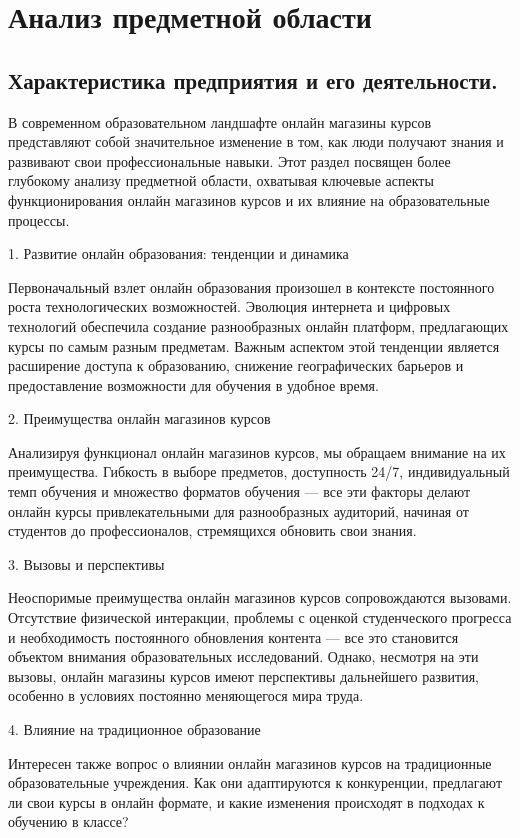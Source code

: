 \section{Анализ предметной области}
\subsection{Характеристика предприятия и его деятельности.}

В современном образовательном ландшафте онлайн магазины курсов представляют собой значительное изменение в том, как люди получают знания и развивают свои профессиональные навыки. Этот раздел посвящен более глубокому анализу предметной области, охватывая ключевые аспекты функционирования онлайн магазинов курсов и их влияние на образовательные процессы.

1. Развитие онлайн образования: тенденции и динамика

Первоначальный взлет онлайн образования произошел в контексте постоянного роста технологических возможностей. Эволюция интернета и цифровых технологий обеспечила создание разнообразных онлайн платформ, предлагающих курсы по самым разным предметам. Важным аспектом этой тенденции является расширение доступа к образованию, снижение географических барьеров и предоставление возможности для обучения в удобное время.

2. Преимущества онлайн магазинов курсов

Анализируя функционал онлайн магазинов курсов, мы обращаем внимание на их преимущества. Гибкость в выборе предметов, доступность 24/7, индивидуальный темп обучения и множество форматов обучения — все эти факторы делают онлайн курсы привлекательными для разнообразных аудиторий, начиная от студентов до профессионалов, стремящихся обновить свои знания.

3. Вызовы и перспективы

Неоспоримые преимущества онлайн магазинов курсов сопровождаются вызовами. Отсутствие физической интеракции, проблемы с оценкой студенческого прогресса и необходимость постоянного обновления контента — все это становится объектом внимания образовательных исследований. Однако, несмотря на эти вызовы, онлайн магазины курсов имеют перспективы дальнейшего развития, особенно в условиях постоянно меняющегося мира труда.

4. Влияние на традиционное образование

Интересен также вопрос о влиянии онлайн магазинов курсов на традиционные образовательные учреждения. Как они адаптируются к конкуренции, предлагают ли свои курсы в онлайн формате, и какие изменения происходят в подходах к обучению в классе?

